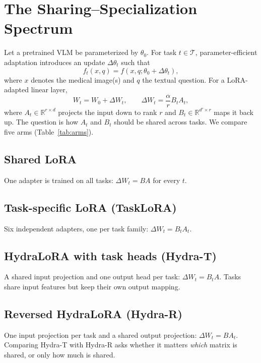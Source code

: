 \documentclass[journal,twoside,web]{ieeecolor}
\begin{document}
\section{The Sharing--Specialization Spectrum}
\label{sec:spectrum}

Let a pretrained VLM be parameterized by $\theta_0$. For task
$t\in\mathcal{T}$, parameter-efficient adaptation introduces an update
$\Delta\theta_t$ such that
\begin{equation}
f_t(x,q)=f(x,q;\theta_0+\Delta\theta_t),
\end{equation}
where $x$ denotes the medical image(s) and $q$ the textual question. For a
LoRA-adapted linear layer,
\begin{equation}
W_t=W_0+\Delta W_t,\qquad \Delta W_t=\frac{\alpha}{r}B_tA_t,
\end{equation}
where $A_t\in\mathbb{R}^{r\times d}$ projects the input down to rank $r$ and
$B_t\in\mathbb{R}^{d'\times r}$ maps it back up. The question is how
$A_t$ and $B_t$ should be shared across tasks. We compare five arms
(Table~\ref{tab:arms}).

\subsection{Shared LoRA}
One adapter is trained on all tasks: $\Delta W_t=BA$ for every $t$.

\subsection{Task-specific LoRA (TaskLoRA)}
Six independent adapters, one per task family: $\Delta W_t=B_tA_t$.

\subsection{HydraLoRA with task heads (Hydra-T)}
A shared input projection and one output head per task:
$\Delta W_t=B_tA$. Tasks share input features but keep their own output
mapping.

\subsection{Reversed HydraLoRA (Hydra-R)}
One input projection per task and a shared output projection:
$\Delta W_t=BA_t$. Comparing Hydra-T with Hydra-R asks whether it matters
\emph{which} matrix is shared, or only how much is shared.
\end{document}
